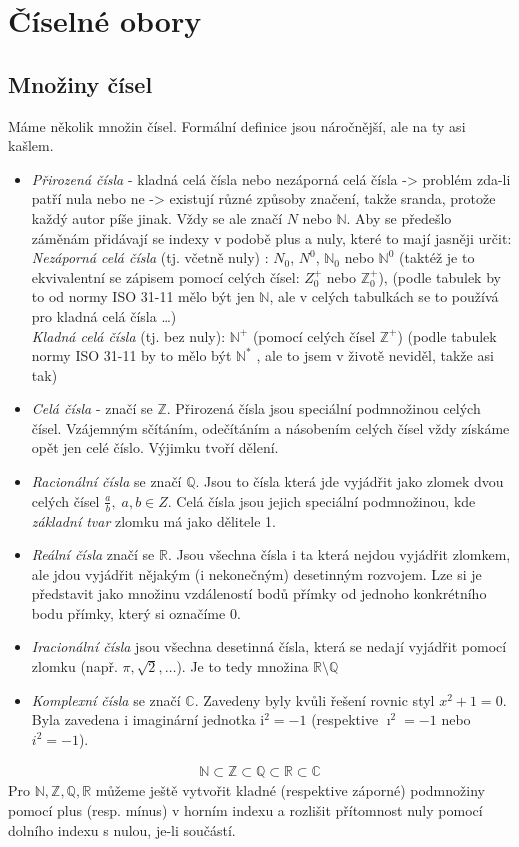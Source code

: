 \documentclass[12pt]{article}
\newcommand{\iu}{\mathrm{i}} %
\begin{document}
\section{Číselné obory}
\subsection{Množiny čísel}
Máme několik množin čísel. Formální definice jsou náročnější, ale na ty asi kašlem.
\begin{itemize}
\item \emph{Přirozená čísla} - kladná celá čísla nebo nezáporná celá čísla -> problém zda-li patří nula nebo ne -> existují různé způsoby značení, takže sranda, protože každý autor píše jinak. Vždy se ale značí $N$ nebo $\mathbb{N}$. Aby se předešlo záměnám přidávají se indexy v podobě plus a nuly, které to mají jasněji určit:\\
\emph{Nezáporná celá čísla} (tj. včetně nuly)	: $N_0$, $N^0$, $\mathbb{N}_0$ nebo $\mathbb{N}^0 $ (taktéž je to ekvivalentní se zápisem pomocí celých čísel: $Z_0^+$ nebo $\mathbb{Z}_0^+$), (podle tabulek by to od normy ISO 31-11 mělo být jen $\mathbb{N}$, ale v celých tabulkách se to používá pro kladná celá čísla \dots)\\
\emph{Kladná celá čísla} (tj. bez nuly): $\mathbb{N}^+$ (pomocí celých čísel $\mathbb{Z}^+$) (podle tabulek normy ISO 31-11 by to mělo být $\mathbb{N}^*$ , ale to jsem v životě neviděl, takže asi tak) 
\item \emph{Celá čísla} - značí se $\mathbb{Z}$. Přirozená čísla jsou speciální podmnožinou celých čísel. Vzájemným sčítáním, odečítáním a násobením celých čísel vždy získáme opět jen celé číslo. Výjimku tvoří dělení. 
\item \emph{Racionální čísla} se značí $\mathbb{Q}$. Jsou to čísla která jde vyjádřit jako zlomek dvou celých čísel $\frac{a}{b},\; a,b \in Z$. Celá čísla jsou jejich speciální podmnožinou, kde \emph{základní tvar} zlomku má jako dělitele 1.
\item \emph{Reální čísla} značí se $\mathbb{R}$. Jsou všechna čísla i ta která nejdou vyjádřit zlomkem, ale jdou vyjádřit nějakým (i nekonečným) desetinným rozvojem. Lze si je představit jako množinu vzdáleností bodů přímky od jednoho konkrétního bodu přímky, který si označíme 0.
\item \emph{Iracionální čísla} jsou všechna desetinná čísla, která se nedají vyjádřit pomocí zlomku (např. $\pi, \sqrt{2}, \dotsc$). Je to tedy množina $\mathbb{R} \setminus \mathbb{Q}$
\item \emph{Komplexní čísla} se značí $\mathbb{C}$. Zavedeny byly kvůli řešení rovnic styl $x^2 + 1 = 0$. Byla zavedena $	\iu$ imaginární jednotka $\iu^2 = -1$ (respektive $\imath^2 = -1$  nebo $i^2 = -1$).
\end{itemize}
\begin{align}
\mathbb{N} \subset \mathbb{Z} \subset \mathbb{Q} \subset \mathbb{R} \subset \mathbb{C}
\end{align}
Pro $\mathbb{N}, \mathbb{Z}, \mathbb{Q}, \mathbb{R}$ můžeme ještě vytvořit kladné (respektive záporné) podmnožiny pomocí plus (resp. mínus) v horním indexu a rozlišit přítomnost nuly pomocí dolního indexu s nulou, je-li součástí.
\end{document}
